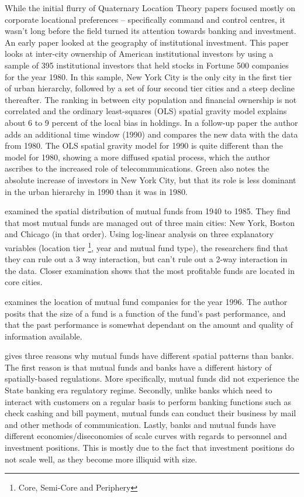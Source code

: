 While the initial flurry of Quaternary Location Theory papers focused mostly on corporate locational preferences -- specifically command and control centres, it wasn't long before the field turned its attention towards banking and investment. An early paper \citep{greena1993} looked at the geography of institutional investment.  This paper looks at inter-city ownership of American institutional investors by using a sample of 395 institutional investors that held stocks in Fortune 500 companies for the year 1980.  In this sample, New York City is the only city in the first tier of urban hierarchy, followed by a set of four second tier cities and a steep decline thereafter.  The ranking in between city population and financial ownership is not correlated and the ordinary least-squares (OLS) spatial gravity model explains about 6 to 9 percent of the local bias in holdings.  In a follow-up paper \citep{Green1995} the author adds an additional time window (1990) and compares the new data with the data from 1980.  The OLS spatial gravity model for 1990 is quite different than the model for 1980, showing a more diffused spatial process, which the author ascribes to the increased role of telecommunications.  Green also notes the absolute increase of investors in New York City, but that its role is less dominant in the urban hierarchy in 1990 than it was in 1980.  
	
\cite{GreenMeyer1996} examined the spatial distribution of mutual funds from 1940 to 1985.  They find that most mutual funds are managed out of three main cities: New York, Boston and Chicago (in that order).  Using log-linear analysis on three explanatory variables (location  tier \footnote{Core, Semi-Core and Periphery}, year and mutual fund type), the researchers find that they can rule out a 3 way interaction, but can't rule out a 2-way interaction in the data.  Closer examination shows that the most profitable funds are located in core cities.  
	
\cite{gravesthe1998} examines the location of mutual fund companies for the year 1996. The author posits that the size of a fund is a function of the fund's past performance, and that the past performance is somewhat dependant on the amount and quality of information available. 
	
\cite{gravesthe1998} gives three reasons why mutual funds have different spatial patterns than banks.  The first reason is that mutual funds and banks have a different history of spatially-based regulations.  More specifically, mutual funds did not experience the State banking era regulatory regime.  Secondly, unlike banks which need to interact with customers on a regular basis to perform banking functions such as check cashing and bill payment, mutual funds can conduct their business by mail and other methods of communication.  Lastly, banks and mutual funds have different economies/diseconomies of scale curves with regards to personnel and investment positions.  This is mostly due to the fact that investment positions do not scale well, as they become more illiquid with size.  
	
